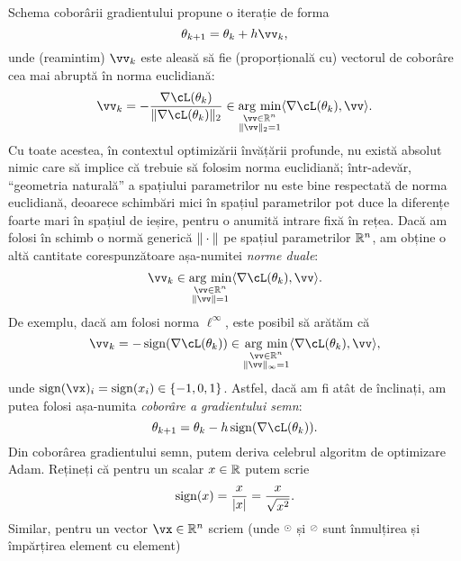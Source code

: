 \documentclass[../../book-main_ro.tex]{subfiles}
\begin{document}
Schema coborârii gradientului propune o iterație de forma
\begin{equation}
    \theta_{k + 1} = \theta_{k} + h\vv_{k},
\end{equation}
unde (reamintim) \(\vv_{k}\) este aleasă să fie (proporțională cu) vectorul de coborâre cea mai abruptă în norma euclidiană:
\begin{equation}
    \vv_{k} = -\frac{\nabla \cL(\theta_{k})}{\norm{\nabla \cL(\theta_{k})}_{2}} \in \argmin_{\substack{\vv \in \R^{n} \\ \norm{\vv}_{2} = 1}}\ip{\nabla \cL(\theta_{k})}{\vv}.
\end{equation}
Cu toate acestea, în contextul optimizării învățării profunde, nu există absolut nimic care să implice că trebuie să folosim norma euclidiană; într-adevăr, ``geometria naturală'' a spațiului parametrilor nu este bine respectată de norma euclidiană, deoarece schimbări mici în spațiul parametrilor pot duce la diferențe foarte mari în spațiul de ieșire, pentru o anumită intrare fixă în rețea. Dacă am folosi în schimb o normă generică \(\norm{\cdot}\) pe spațiul parametrilor \(\mathbb{R}^{n}\), am obține o altă cantitate corespunzătoare așa-numitei \textit{norme duale}:
\begin{equation}
    \vv_{k} \in \argmin_{\substack{\vv \in \R^{n} \\ \norm{\vv} = 1}}\ip{\nabla \cL(\theta_{k})}{\vv}.
\end{equation}
De exemplu, dacă am folosi norma \(\ell^{\infty}\), este posibil să arătăm că
\begin{equation}
    \vv_{k} = -\sign(\nabla \cL(\theta_{k})) \in \argmin_{\substack{\vv \in \R^{n} \\ \norm{\vv}_{\infty} = 1}}\ip{\nabla \cL(\theta_{k})}{\vv},
\end{equation}
unde \(\sign(\vx)_{i} = \sign(x_{i}) \in \{-1, 0, 1\}\). Astfel, dacă am fi atât de înclinați, am putea folosi așa-numita \textit{coborâre a gradientului semn}:
\begin{equation}\label{eq:sign_gradient_descent}
    \theta_{k + 1} = \theta_{k} - h\sign(\nabla \cL(\theta_{k})).
\end{equation}
Din coborârea gradientului semn, putem deriva celebrul algoritm de optimizare Adam. Rețineți că pentru un scalar \(x \in \mathbb{R}\) putem scrie
\begin{equation}
    \sign(x) = \frac{x}{\abs{x}} = \frac{x}{\sqrt{x^{2}}}.
\end{equation}
Similar, pentru un vector \(\vx \in \R^{n}\) scriem (unde \(\hada\) și \(\haddiv\) sunt înmulțirea și împărțirea element cu element)
\end{document}
